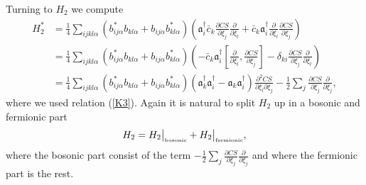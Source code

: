 \documentclass[letterpaper,11pt]{article}
\newcommand{\nn}{\nonumber}
\def\a{\alpha}
\def\d{\delta}
\newcommand{\pa}{\partial}
\begin{document}
Turning to $H_2$ we compute 
\begin{align}
H_2^*  &= \frac{1}{4} \sum_{ijkl\a}  ( b^*_{ij\a} b_{kl\a}  +   b_{ij\a} b^*_{kl\a}  )\left(    \mathfrak{a}^\dagger_i   \bar{c}_k  \frac{\pa CS}{\pa \xi_j}   \frac{\pa }{\pa \xi_l} +         \bar{c}_k \mathfrak{a}^\dagger_i   \frac{\pa }{\pa \xi_l}      \frac{\pa CS}{\pa \xi_j}                      \right)
\nn\\
&= 
 \frac{1}{4} \sum_{ijkl\a}  ( b^*_{ij\a} b_{kl\a}  +   b_{ij\a} b^*_{kl\a}  ) \left( 
- \bar{c}_k \mathfrak{a}^\dagger_i   \left[   \frac{\pa }{\pa \xi_l}    ,    \frac{\pa CS}{\pa \xi_j}      \right]  
- \d_{ki} \frac{\pa CS}{\pa \xi_j}   \frac{\pa }{\pa \xi_l} 
 \right)
 \nn\\
 &=
  \frac{1}{4} \sum_{ijkl\a}  ( b^*_{ij\a} b_{kl\a}  +   b_{ij\a} b^*_{kl\a}  ) \left(   
    \mathfrak{a}^\dagger_k \mathfrak{a}^\dagger_i      
  -  \mathfrak{a}_k \mathfrak{a}^\dagger_i     
\right)   \frac{\pa^2 CS}{\pa \xi_l \pa \xi_j}  
-\frac{1}{2} \sum_j \frac{\pa CS}{\pa \xi_j}   \frac{\pa }{\pa \xi_j} ,
\label{stiglitz}
\end{align}
where we used relation (\ref{K3}). 
Again it is natural to split $H_2$ up in a bosonic and fermionic part
\begin{equation}
H_2 = H_2\big\vert_{\mbox{\tiny bosonic}}   +   H_2\big\vert_{\mbox{\tiny fermionic}},
\label{Pl2}
\end{equation}
where the bosonic part consist of the term $-\frac{1}{2}  \sum_j \frac{\pa CS}{\pa \xi_j}   \frac{\pa }{\pa \xi_j} $ and where the fermionic part is the rest.
\end{document}
